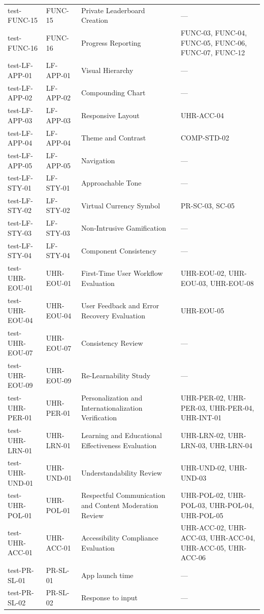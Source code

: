 \documentclass[12pt, titlepage]{article}
\begin{document}
\begin{xltabular}{\textwidth}{p{3cm}p{2.3cm}>{\raggedright\arraybackslash}X>{\raggedright\arraybackslash}p{2.4cm}}
  test-FUNC-15 & FUNC-15 & Private Leaderboard Creation & ---\\
  test-FUNC-16 & FUNC-16 & Progress Reporting & FUNC-03, FUNC-04, FUNC-05, FUNC-06, FUNC-07, FUNC-12\\
  test-LF-APP-01 & LF-APP-01 & Visual Hierarchy & ---\\
  test-LF-APP-02 & LF-APP-02 & Compounding Chart & ---\\
  test-LF-APP-03 & LF-APP-03 & Responsive Layout & UHR-ACC-04\\
  test-LF-APP-04 & LF-APP-04 & Theme and Contrast & COMP-STD-02\\
  test-LF-APP-05 & LF-APP-05 & Navigation & ---\\
  test-LF-STY-01 & LF-STY-01 & Approachable Tone & ---\\
  test-LF-STY-02 & LF-STY-02 & Virtual Currency Symbol & PR-SC-03, SC-05\\
  test-LF-STY-03 & LF-STY-03 & Non-Intrusive Gamification & ---\\
  test-LF-STY-04 & LF-STY-04 & Component Consistency & ---\\
  test-UHR-EOU-01 & UHR-EOU-01 & First-Time User Workflow Evaluation & UHR-EOU-02, UHR-EOU-03, UHR-EOU-08\\
  test-UHR-EOU-04 & UHR-EOU-04 & User Feedback and Error Recovery Evaluation & UHR-EOU-05\\
  test-UHR-EOU-07 & UHR-EOU-07 & Consistency Review & ---\\
  test-UHR-EOU-09 & UHR-EOU-09 & Re-Learnability Study & ---\\
  test-UHR-PER-01 & UHR-PER-01 & Personalization and Internationalization Verification & UHR-PER-02, UHR-PER-03, UHR-PER-04, UHR-INT-01\\
  test-UHR-LRN-01 & UHR-LRN-01 & Learning and Educational Effectiveness Evaluation & UHR-LRN-02, UHR-LRN-03, UHR-LRN-04\\
  test-UHR-UND-01 & UHR-UND-01 & Understandability Review & UHR-UND-02, UHR-UND-03\\
  test-UHR-POL-01 & UHR-POL-01 & Respectful Communication and Content Moderation Review & UHR-POL-02, UHR-POL-03, UHR-POL-04, UHR-POL-05\\
  test-UHR-ACC-01 & UHR-ACC-01 & Accessibility Compliance Evaluation & UHR-ACC-02, UHR-ACC-03, UHR-ACC-04, UHR-ACC-05, UHR-ACC-06\\
  test-PR-SL-01 & PR-SL-01 & App launch time & ---\\
  test-PR-SL-02 & PR-SL-02 & Response to input & ---\\

\end{xltabular}
\end{document}
